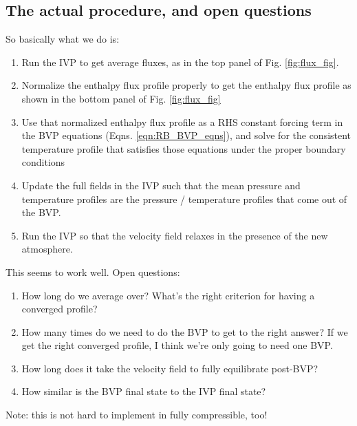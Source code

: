 \documentclass[aps, pre, onecolumn, nofootinbib, notitlepage, groupedaddress, amsfonts, amssymb, amsmath, longbibliography]{revtex4-1}
\begin{document}
\begin{enumerate}
\subsection{The actual procedure, and open questions}
So basically what we do is:
\begin{enumerate}
\item Run the IVP to get average fluxes, as in the top panel of Fig. \ref{fig:flux_fig}.
\item Normalize the enthalpy flux profile properly to get the enthalpy flux profile as shown
in the bottom panel of Fig. \ref{fig:flux_fig}
\item Use that normalized enthalpy flux profile as a RHS constant forcing term in the BVP equations
(Eqns. \ref{eqn:RB_BVP_eqns}), and solve for the consistent temperature profile that satisfies
those equations under the proper boundary conditions
\item Update the full fields in the IVP such that the mean pressure and temperature profiles are
the pressure / temperature profiles that come out of the BVP.
\item Run the IVP so that the velocity field relaxes in the presence of the new atmosphere.
\end{enumerate}

This seems to work well.  Open questions:
\begin{enumerate}
\item How long do we average over?  What's the right criterion for having a converged profile?
\item How many times do we need to do the BVP to get to the right answer?  If we get the right
converged profile, I think we're only going to need one BVP.
\item How long does it take the velocity field to fully equilibrate post-BVP?
\item How similar is the BVP final state to the IVP final state?
\end{enumerate}

Note: this is not hard to implement in fully compressible, too!


\end{enumerate}
\end{document}
